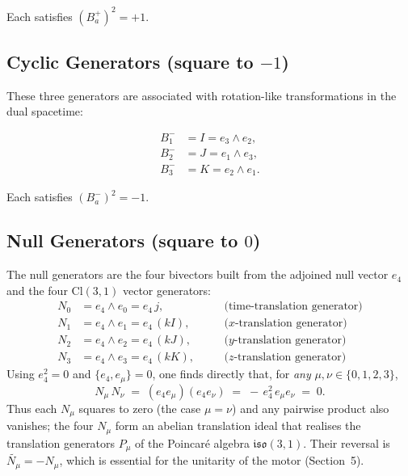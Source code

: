 \documentclass[dvipdfmx,a4paper]{article}
\theoremstyle{definition}
\theoremstyle{plain}
\theoremstyle{remark}
\begin{document}
Each satisfies \((B_{a}^{+})^{2} = +1\).

\subsection{Cyclic Generators (square to \(-1\))}

These three generators are associated with rotation-like transformations in the dual spacetime:

\begin{align*}
B_{1}^{-} &= I = e_{3}\wedge e_{2}, \\
B_{2}^{-} &= J = e_{1}\wedge e_{3}, \\
B_{3}^{-} &= K = e_{2}\wedge e_{1}.
\end{align*}

Each satisfies \((B_{a}^{-})^{2} = -1\).

\subsection{Null Generators (square to \(0\))}

The null generators are the four bivectors built from the adjoined null vector \(e_{4}\) and the four \(\mathrm{Cl}(3,1)\) vector generators:
\begin{align*}
N_{0} &= e_{4}\wedge e_{0} = e_{4}\,j,         &\quad& \text{(time-translation generator)}\\
N_{1} &= e_{4}\wedge e_{1} = e_{4}\,(kI),      &\quad& \text{(}x\text{-translation generator)}\\
N_{2} &= e_{4}\wedge e_{2} = e_{4}\,(kJ),      &\quad& \text{(}y\text{-translation generator)}\\
N_{3} &= e_{4}\wedge e_{3} = e_{4}\,(kK),      &\quad& \text{(}z\text{-translation generator)}
\end{align*}
Using \(e_{4}^{2}=0\) and \(\{e_{4},e_{\mu}\}=0\), one finds directly that, for \emph{any} \(\mu,\nu\in\{0,1,2,3\}\),
\[
N_{\mu}\,N_{\nu} \;=\; (e_{4}e_{\mu})(e_{4}e_{\nu}) \;=\; -\,e_{4}^{2}\,e_{\mu}e_{\nu} \;=\; 0.
\]
Thus each \(N_{\mu}\) squares to zero (the case \(\mu=\nu\)) and any pairwise product also vanishes; the four \(N_{\mu}\) form an abelian translation ideal that realises the translation generators \(P_{\mu}\) of the Poincar\'{e} algebra \(\mathfrak{iso}(3,1)\). Their reversal is \(\widetilde{N_{\mu}}=-N_{\mu}\), which is essential for the unitarity of the motor (Section~5).
\end{document}
